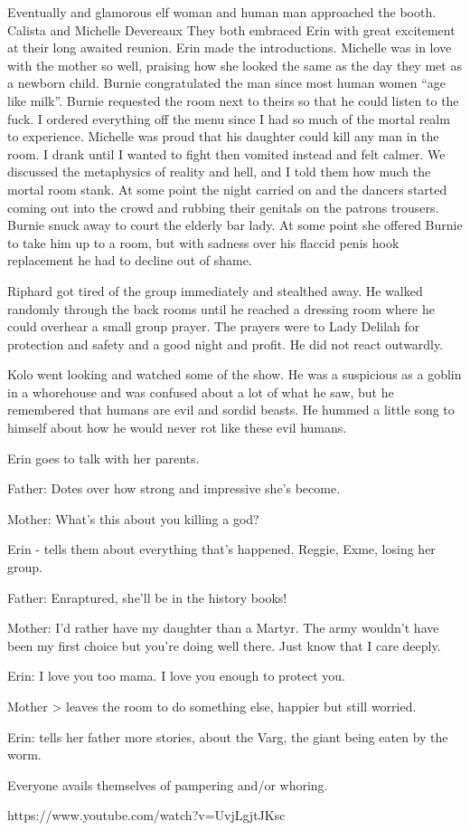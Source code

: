 Eventually and glamorous elf woman and human man approached the booth. Calista and Michelle Devereaux They both embraced Erin with great excitement at their long awaited reunion. Erin made the introductions. Michelle was in love with the mother so well, praising how she looked the same as the day they met as a newborn child. Burnie congratulated the man since most human women “age like milk”. Burnie requested the room next to theirs so that he could listen to the fuck. I ordered everything off the menu since I had so much of the mortal realm to experience. Michelle was proud that his daughter could kill any man in the room. I drank until I wanted to fight then vomited instead and felt calmer. We discussed the metaphysics of reality and hell, and I told them how much the mortal room stank. At some point the night carried on and the dancers started coming out into the crowd and rubbing their genitals on the patrons trousers. Burnie snuck away to court the elderly bar lady. At some point she offered Burnie to take him up to a room, but with sadness over his flaccid penis hook replacement he had to decline out of shame.\medskip

Riphard got tired of the group immediately and stealthed away. He walked randomly through the back rooms until he reached a dressing room where he could overhear a small group prayer. The prayers were to Lady Delilah for protection and safety and a good night and profit. He did not react outwardly.\medskip

Kolo went looking and watched some of the show. He was a suspicious as a goblin in a whorehouse and was confused about a lot of what he saw, but he remembered that humans are evil and sordid beasts. He hummed a little song to himself about how he would never rot like these evil humans.\medskip

Erin goes to talk with her parents.\medskip

Father: Dotes over how strong and impressive she’s become.\medskip

Mother: What’s this about you killing a god?\medskip

Erin - tells them about everything that’s happened. Reggie, Exme, losing her group.\medskip

Father: Enraptured, she’ll be in the history books!\medskip

Mother: I’d rather have my daughter than a Martyr. The army wouldn’t have been my first choice but you’re doing well there. Just know that I care deeply.\medskip

Erin: I love you too mama. I love you enough to protect you.\medskip

Mother > leaves the room to do something else, happier but still worried.\medskip

Erin: tells her father more stories, about the Varg, the giant being eaten by the worm.\medskip

Everyone avails themselves of pampering and/or whoring.\medskip

https://www.youtube.com/watch?v=UvjLgjtJKsc\medskip

\vspace*{5mm}
